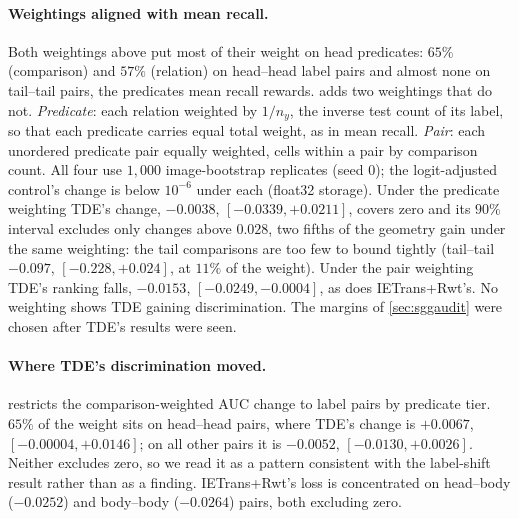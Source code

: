 \paragraph{Weightings aligned with mean recall.} Both weightings above put most of their
weight on head predicates: $65\%$ (comparison) and $57\%$ (relation) on head--head label pairs
and almost none on tail--tail pairs, the predicates mean recall rewards. 
adds two weightings that do not. \emph{Predicate}: each relation weighted by $1/n_y$, the
inverse test count of its label, so that each predicate carries equal total weight, as in mean
recall. \emph{Pair}: each unordered predicate pair equally weighted, cells within a pair by
comparison count. All four use $1{,}000$ image-bootstrap replicates (seed 0); the logit-adjusted
control's change is below $10^{-6}$ under each (float32 storage). Under the predicate weighting TDE's change,
$-0.0038$, $[-0.0339,+0.0211]$, covers zero and its $90\%$ interval excludes only changes above
$0.028$, two fifths of the geometry gain under the same weighting: the tail comparisons are too
few to bound tightly (tail--tail $-0.097$, $[-0.228,+0.024]$, at $11\%$ of the weight). Under the
pair weighting TDE's ranking falls, $-0.0153$, $[-0.0249,-0.0004]$, as does IETrans+Rwt's. No
weighting shows TDE gaining discrimination. The margins of \cref{sec:sggaudit} were chosen after
TDE's results were seen.

\begin{table}[h]
\centering
\scriptsize
\caption{\textbf{Within-cell AUC change under four weightings} (all identified relations,
$1{,}000$ image-bootstrap replicates, $95\%$ intervals). Predicate: each predicate equal total
weight, as in mean recall; pair: each predicate pair equal weight. Lower rows: TDE's $90\%$
bound, the geometry-over-class-pair gain of \cref{sec:vgvisual} under the same weighting, and
each weighting's share on each predicate-tier pair.}
\label{tab:labelweighting}
\resizebox{\linewidth}{!}{}
\end{table}

\paragraph{Where TDE's discrimination moved.}  restricts the
comparison-weighted AUC change to label pairs by predicate tier. $65\%$ of the weight sits on
head--head pairs, where TDE's change is $+0.0067$, $[-0.00004,+0.0146]$; on all other pairs it is
$-0.0052$, $[-0.0130,+0.0026]$. Neither excludes zero, so we read it as a pattern consistent with
the label-shift result rather than as a finding. IETrans+Rwt's loss is concentrated on
head--body ($-0.0252$) and body--body ($-0.0264$) pairs, both excluding zero.

